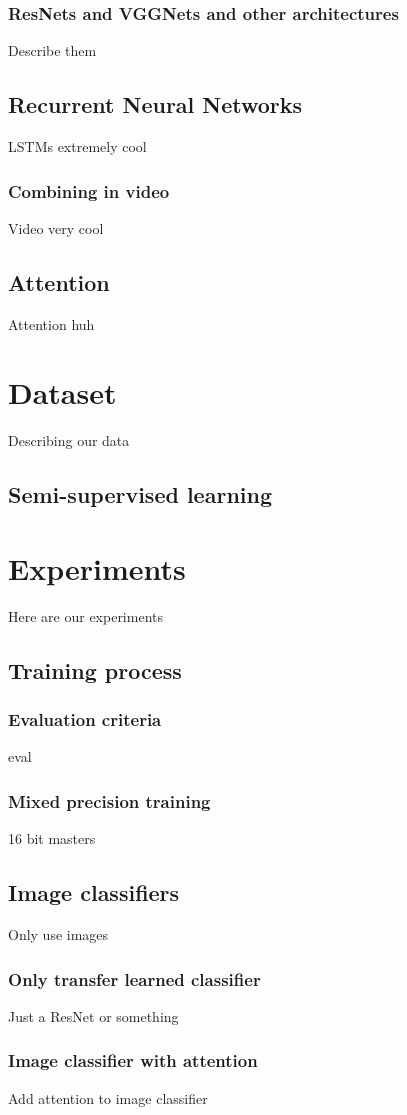 \subsection{ResNets and VGGNets and other architectures}
Describe them
\section{Recurrent Neural Networks}
LSTMs extremely cool
\subsection{Combining in video}
Video very cool
\section{Attention}
Attention huh

\chapter{Dataset}
Describing our data
\section{Semi-supervised learning}

\chapter{Experiments}
Here are our experiments
\section{Training process}
\subsection{Evaluation criteria}
eval
\subsection{Mixed precision training}
16 bit  masters
\section{Image classifiers}
Only use images
\subsection{Only transfer learned classifier}
Just a ResNet or something
\subsection{Image classifier with attention}
Add attention to image classifier
